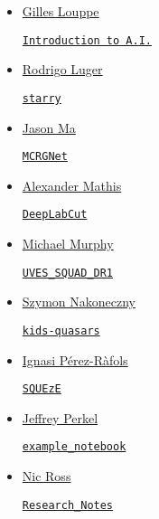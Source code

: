 \documentclass[11pt,a4paper]{article}
\begin{document}
\begin{itemize}
\item \href{https://github.com/glouppe}{Gilles Louppe}
  \begin{itemize}
    \href{https://github.com/glouppe/info8006-introduction-to-ai}{\tt  Introduction to A.I.}
  \end{itemize}

\item \href{https://github.com/rodluger}{Rodrigo Luger}
  \begin{itemize}
    \href{https://github.com/rodluger/starry}{{\tt starry}}
  \end{itemize}

\item \href{https://github.com/myinxd}{Jason Ma}
  \begin{itemize}
    \href{https://github.com/myinxd/mcrgnet}{\tt MCRGNet}
  \end{itemize}

\item \href{https://github.com/AlexEMG}{Alexander Mathis}
  \begin{itemize}
    \href{https://github.com/AlexEMG/DeepLabCut}{\tt DeepLabCut} 
  \end{itemize}

\item \href{https://github.com/MTMurphy77/}{Michael Murphy}
  \begin{itemize}
    \href{https://github.com/MTMurphy77/UVES_SQUAD_DR1}{\tt UVES\_SQUAD\_DR1}
  \end{itemize}

  \item \href{https://github.com/snakoneczny}{Szymon Nakoneczny}
  \begin{itemize}
    \href{https://github.com/snakoneczny/kids-quasars}{\tt kids-quasars}
  \end{itemize}

\item \href{https://github.com/iprafols/}{Ignasi P\'{e}rez-R\`{a}fols}
  \begin{itemize}
    \href{https://github.com/iprafols/SQUEzE}{\tt SQUEzE}
  \end{itemize}

\item \href{https://github.com/jperkel/}{Jeffrey Perkel}
  \begin{itemize}
    \href{https://github.com/jperkel/example_notebook}{\tt example\_notebook}
  \end{itemize}

\item \href{https://github.com/d80b2t}{Nic Ross}
  \begin{itemize}
    \href{https://github.com/d80b2t/Research\_Notes}{\tt Research\_Notes}
  \end{itemize}


\end{itemize}
\end{document}
